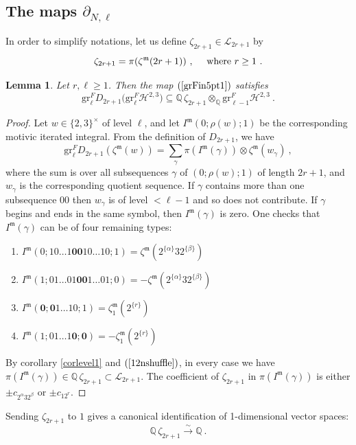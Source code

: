 \documentclass[10pt]{amsart}
\newtheorem{lem}[thm]{Lemma}
\theoremstyle{definition}
\theoremstyle{remark}
\numberwithin{equation}{section}
\newcommand{\gr}{\mathrm{gr}}
\newcommand{\Ho}{\mathcal{H}}
\newcommand{\zetam}{\zeta^{ \mathfrak{m}}}
\newcommand{\Imot}{I^{\mathfrak{m}}}
\newcommand{\Q}{\mathbb Q}
\newcommand{\Lo}{\mathcal{L}}
\newcommand{\To}{\longrightarrow}
\newcommand{\oo}{\mathbf{00}}
\newcommand{\os}{\mathbf{0}}
\begin{document}
\subsection{The maps $\partial_{N,\ell}$} In order to simplify  notations, let us define $\zeta_{2r+1}\in \Lo_{2r+1}$  by 
 $$\zeta_{2r+1}=\pi(\zetam(2r+1))  \ ,\quad \hbox{ where } r\geq 1\ .$$



\begin{lem} \label{lemdelta}   Let $r, \ell \geq 1$. Then  the map $(\ref{grFin5pt1})$ satisfies 
$$\gr^F_{\ell} D_{2r+1} \big( \gr^F_{\ell} \Ho^{2,3} \big) \subseteq \Q\, \zeta_{2r+1} \otimes_{\Q} \gr^F_{\ell-1}\Ho^{2,3}\ .$$
\end{lem}
\begin{proof} Let $w\in \{2,3\}^{\times}$ of level $\ell$, and let $\Imot(0;\rho(w);1)$ be the corresponding motivic iterated integral.  From the definition of  $D_{2r+1}$, we  have
\begin{equation}\label{formofdelta}
\gr^F_{\ell} D_{2r+1} (\zetam(w)) = \sum_{\gamma}  \pi(\Imot(\gamma))\otimes \zetam(w_\gamma)\ ,
\end{equation}
where  the sum is over all subsequences $\gamma$ of $(0;\rho(w);1)$ of length $2r+1$, 
and $w_\gamma$ is the corresponding  quotient sequence. If $\gamma$ contains more than one subsequence $00$ then $w_{\gamma}$ is of level $< \ell-1$ and so does not contribute.
If $\gamma$ begins and ends in the same symbol, then $\Imot(\gamma)$ is zero.  One checks that  $\Imot(\gamma)$ can be  of four  remaining  types:
\begin{enumerate}
\item  $\Imot(0;10\ldots 1\oo10 \ldots 10;1) = \zetam(2^{\{\alpha\}}32^{\{\beta\}})$
\item  $\Imot(1;01\ldots 01\oo1 \ldots 01;0) = -\zetam(2^{\{\alpha\}}32^{\{\beta\}})$
\item $\Imot(\os;\os1\ldots 10;1)  = \zetam_1(2^{\{r\}})$
\item $ \Imot(1;01\ldots 1\os;\os) = - \zetam_1(2^{\{r\}})$
\end{enumerate}
By corollary \ref{corlevel1} and $(\ref{12nshuffle})$, in every case we have $\pi(\Imot(\gamma)) \in \Q\, \zeta_{2r+1}\subset \Lo_{2r+1}$. 
The coefficient of $\zeta_{2r+1}$ in   $\pi(\Imot(\gamma))$ is either   $\pm c_{2^\alpha32^\beta}$ or $\pm c_{12^r}$.
\end{proof}
Sending $\zeta_{2r+1}$ to $1$ gives  a canonical identification of 1-dimensional vector spaces:
\begin{equation}\label{Qid}
\Q\, \zeta_{2r+1}  \overset{\sim}{\To}  \Q\ .  \end{equation}
\end{document}
